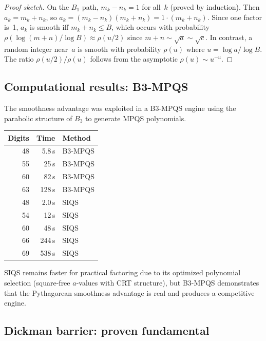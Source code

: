 \documentclass[12pt]{amsart}
\theoremstyle{definition}
\theoremstyle{remark}
\begin{document}
\begin{proof}[Proof sketch]
On the $B_{1}$ path, $m_{k}-n_{k}=1$ for all~$k$ (proved by induction).
Then $a_{k}=m_{k}+n_{k}$, so $a_{k}=(m_{k}-n_{k})(m_{k}+n_{k})=1\cdot
(m_{k}+n_{k})$.  Since one factor is~1, $a_{k}$ is smooth iff
$m_{k}+n_{k}\le B$, which occurs with probability $\rho(\log(m+n)/\log B)
\approx\rho(u/2)$ since $m+n\sim\sqrt{a}\sim\sqrt{c}$.  In contrast, a random
integer near~$a$ is smooth with probability $\rho(u)$ where $u=\log a/\log B$.
The ratio $\rho(u/2)/\rho(u)$ follows from the asymptotic $\rho(u)\sim u^{-u}$.
\end{proof}

\subsection{Computational results: B3-MPQS}

The smoothness advantage was exploited in a B3-MPQS engine using the parabolic
structure of $B_{3}$ to generate MPQS polynomials.

\begin{center}
\begin{tabular}{@{}rrl@{}}
\toprule
Digits & Time & Method \\
\midrule
48 & 5.8\,s & B3-MPQS \\
55 & 25\,s & B3-MPQS \\
60 & 82\,s & B3-MPQS \\
63 & 128\,s & B3-MPQS \\
\midrule
48 & 2.0\,s & SIQS \\
54 & 12\,s & SIQS \\
60 & 48\,s & SIQS \\
66 & 244\,s & SIQS \\
69 & 538\,s & SIQS \\
\bottomrule
\end{tabular}
\end{center}

\noindent
SIQS remains faster for practical factoring due to its optimized polynomial
selection (square-free $a$-values with CRT structure), but B3-MPQS demonstrates
that the Pythagorean smoothness advantage is real and produces a competitive
engine.

\subsection{Dickman barrier: proven fundamental}
\end{document}
